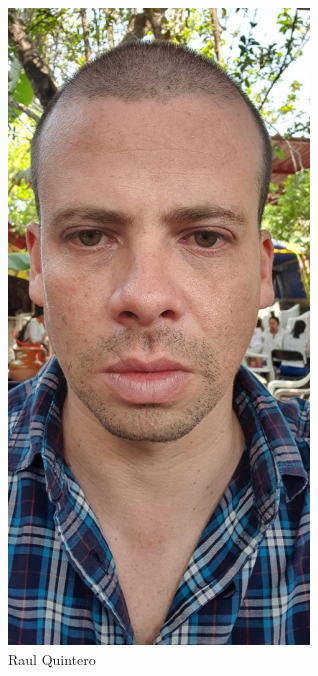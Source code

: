 \documentclass[aspectratio=169,9pt]{beamer}
\begin{document}
\begin{frame}
\begin{columns}
        \begin{column}{0.20\textwidth}
\centering
\includegraphics[width=0.6\textwidth]{fig/Raul.jpg}
\\
Raul Quintero
        \end{column}
        \end{columns}

\end{frame}
\end{document}
